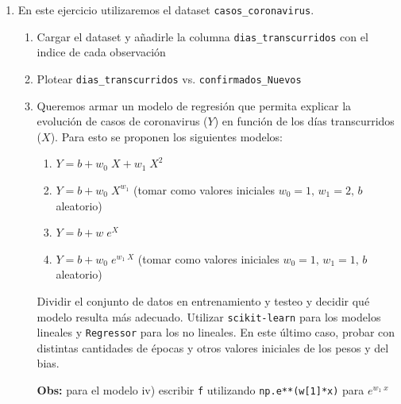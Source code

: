 \documentclass[a4paper,11pt]{article}
\theoremstyle{definition}
\begin{document}
\begin{enumerate}
    \item En este ejercicio utilizaremos el dataset \verb|casos_coronavirus|.
    \begin{enumerate}
        \item Cargar el dataset y añadirle la columna \verb|dias_transcurridos| con el indice de cada observación
        \item Plotear \verb|dias_transcurridos| vs. \verb|confirmados_Nuevos|
        \item Queremos armar un modelo de regresión que permita explicar la evolución de casos de coronavirus ($Y$) en función de los días transcurridos ($X$). Para esto se proponen los siguientes modelos:
        \begin{enumerate}
            \item $Y = b + w_0\;X + w_1\; X^2$
            \item $Y = b + w_0\; X^{w_1}$ (tomar como valores iniciales $w_0=1,\, w_1=2,\, b$ aleatorio)
            \item $Y = b + w\; e^{X}$ 
            \item $Y = b + w_0\; e^{w_1\; X}$ (tomar como valores iniciales $w_0=1,\, w_1=1,\, b$ aleatorio)
        \end{enumerate}
        Dividir el conjunto de datos en entrenamiento y testeo y decidir qué modelo resulta más adecuado. Utilizar \verb|scikit-learn| para los modelos lineales y \verb|Regressor| para los no lineales. En este último caso,
        probar con distintas cantidades de épocas y otros valores iniciales de los pesos y del
bias.
        
        \textbf{Obs:} para el modelo iv) escribir \verb|f| utilizando \verb|np.e**(w[1]*x)| para $e^{w_1\; x}$
    \end{enumerate}



\end{enumerate}
\end{document}
